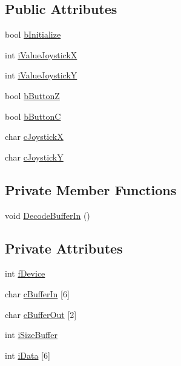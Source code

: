 \subsection*{Public Attributes}
\begin{DoxyCompactItemize}
\item 
bool \hyperlink{classNunchuck_a3ecbcb3a01a247605b4f0a37b579581d}{b\-Initialize}
\item 
int \hyperlink{classNunchuck_a931870243c74e9df416639c53670b234}{i\-Value\-Joystick\-X}
\item 
int \hyperlink{classNunchuck_a0e084b1760acfc06305bbb339e3c8232}{i\-Value\-Joystick\-Y}
\item 
bool \hyperlink{classNunchuck_a0db1f3d2f58fafda23a5af3936c12598}{b\-Button\-Z}
\item 
bool \hyperlink{classNunchuck_a1d5cac3b603b3060984e3184d795561d}{b\-Button\-C}
\item 
char \hyperlink{classNunchuck_ad9467642b97b8b008ddd137d273a22f8}{c\-Joystick\-X}
\item 
char \hyperlink{classNunchuck_aaf0f299016f5acf686f716518a7ce567}{c\-Joystick\-Y}
\end{DoxyCompactItemize}
\subsection*{Private Member Functions}
\begin{DoxyCompactItemize}
\item 
void \hyperlink{classNunchuck_aac4e5f6da04ee3fb6beada59aefd1612}{Decode\-Buffer\-In} ()
\end{DoxyCompactItemize}
\subsection*{Private Attributes}
\begin{DoxyCompactItemize}
\item 
int \hyperlink{classNunchuck_a61f4874769103ba04e13f75a08442f8e}{f\-Device}
\item 
char \hyperlink{classNunchuck_a1bd7122f88582d12ab2ac5d3c8c7b8f8}{c\-Buffer\-In} \mbox{[}6\mbox{]}
\item 
char \hyperlink{classNunchuck_a4f2eea10fb4eba245c24168ce00429f8}{c\-Buffer\-Out} \mbox{[}2\mbox{]}
\item 
int \hyperlink{classNunchuck_a671e2732508cdd56e51898b79e58d455}{i\-Size\-Buffer}
\item 
int \hyperlink{classNunchuck_a6bf3cbe405e9611658f1a6bbc1cd56b4}{i\-Data} \mbox{[}6\mbox{]}
\end{DoxyCompactItemize}


